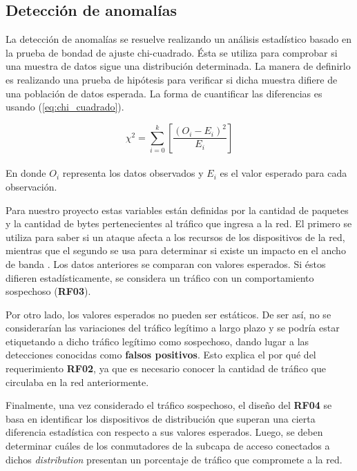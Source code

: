 \subsection{Detección de  anomalías}

La detección de anomalías se resuelve realizando un análisis estadístico basado
en la prueba de bondad de ajuste chi-cuadrado. Ésta se utiliza para comprobar si
una muestra de datos sigue una distribución determinada. La manera de definirlo
es realizando una prueba de hipótesis para verificar si dicha muestra difiere de
una población de datos esperada. La forma de cuantificar las diferencias es
usando (\ref{eq:chi_cuadrado}).

\begin{equation}\label{eq:chi_cuadrado}
\chi^2={\sum_{i=0}^{k} \left [ \frac{(O_{i} - E_{i})^2}{E_{i}} \right ]}
\end{equation}\\

En donde \(O_{i}\) representa los datos observados y \(E_{i}\) es el valor
esperado para cada observación.

Para nuestro proyecto estas variables están definidas por la cantidad de
paquetes y la cantidad de bytes pertenecientes al tráfico que ingresa a la red.
El primero se utiliza para saber si un ataque afecta a los recursos de los
dispositivos de la red, mientras que el segundo se usa para determinar si existe
un impacto en el ancho de banda \parencite{estado_arte_2}. Los datos anteriores
se comparan con valores esperados. Si éstos difieren estadísticamente, se
considera un tráfico con un comportamiento sospechoso (\textbf{RF03}).

Por otro lado, los valores esperados no pueden ser estáticos. De ser así, no se
considerarían las variaciones del tráfico legítimo a largo plazo y se podría
estar etiquetando a dicho tráfico legítimo como sospechoso, dando lugar a las
detecciones conocidas como \textbf{falsos positivos}. Esto explica el por qué
del requerimiento \textbf{RF02}, ya que es necesario conocer la cantidad de
tráfico que circulaba en la red anteriormente.

Finalmente, una vez considerado el tráfico sospechoso, el diseño del
\textbf{RF04} se basa en identificar los dispositivos de distribución que
superan una cierta diferencia estadística con respecto a sus valores esperados.
Luego, se deben determinar cuáles de los conmutadores de la subcapa de acceso
conectados a dichos \textit{distribution} presentan un porcentaje de tráfico que
compromete a la red.

